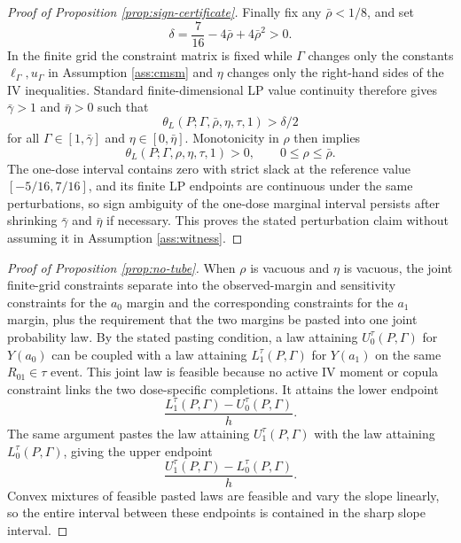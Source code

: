 \documentclass[11pt]{article}
\theoremstyle{definition}
\theoremstyle{plain}
\theoremstyle{remark}
\begin{document}
\begin{proof}[Proof of Proposition \ref{prop:sign-certificate}]
Finally fix any \(\bar\rho<1/8\), and set
\[
\delta=\frac{7}{16}-4\bar\rho+4\bar\rho^2>0.
\]
In the finite grid the constraint matrix is fixed while \(\Gamma\) changes only the constants \(\ell_\Gamma,u_\Gamma\) in Assumption \ref{ass:cmsm} and \(\eta\) changes only the right-hand sides of the IV inequalities.  Standard finite-dimensional LP value continuity therefore gives \(\bar\gamma>1\) and \(\bar\eta>0\) such that
\[
\theta_L(P;\Gamma,\bar\rho,\eta,\tau,1)>\delta/2
\]
for all \(\Gamma\in[1,\bar\gamma]\) and \(\eta\in[0,\bar\eta]\).  Monotonicity in \(\rho\) then implies
\[
\theta_L(P;\Gamma,\rho,\eta,\tau,1)>0,\qquad 0\le\rho\le\bar\rho.
\]
The one-dose interval contains zero with strict slack at the reference value \([-5/16,7/16]\), and its finite LP endpoints are continuous under the same perturbations, so sign ambiguity of the one-dose marginal interval persists after shrinking \(\bar\gamma\) and \(\bar\eta\) if necessary.  This proves the stated perturbation claim without assuming it in Assumption \ref{ass:witness}.
\end{proof}

\begin{proof}[Proof of Proposition \ref{prop:no-tube}]
When \(\rho\) is vacuous and \(\eta\) is vacuous, the joint finite-grid constraints separate into the observed-margin and sensitivity constraints for the \(a_0\) margin and the corresponding constraints for the \(a_1\) margin, plus the requirement that the two margins be pasted into one joint probability law.  By the stated pasting condition, a law attaining \(U_0^\tau(P,\Gamma)\) for \(Y(a_0)\) can be coupled with a law attaining \(L_1^\tau(P,\Gamma)\) for \(Y(a_1)\) on the same \(R_{01}\in\tau\) event.  This joint law is feasible because no active IV moment or copula constraint links the two dose-specific completions.  It attains the lower endpoint
\[
\frac{L_1^\tau(P,\Gamma)-U_0^\tau(P,\Gamma)}{h}.
\]
The same argument pastes the law attaining \(U_1^\tau(P,\Gamma)\) with the law attaining \(L_0^\tau(P,\Gamma)\), giving the upper endpoint
\[
\frac{U_1^\tau(P,\Gamma)-L_0^\tau(P,\Gamma)}{h}.
\]
Convex mixtures of feasible pasted laws are feasible and vary the slope linearly, so the entire interval between these endpoints is contained in the sharp slope interval.
\end{proof}
\end{document}
